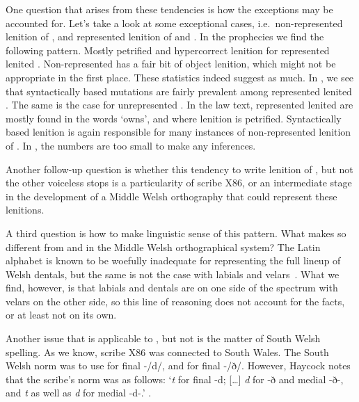 One question that arises from these tendencies is how the exceptions may be accounted for. Let's take a look at some exceptional cases, i.e.\ non-represented lenition of , and represented lenition of  and . In the prophecies we find the following pattern. Mostly petrified and hypercorrect lenition for represented lenited . Non-represented  has a fair bit of object lenition, which might not be appropriate in the first place. These statistics indeed suggest as much. In , we see that syntactically based mutations are fairly prevalent among represented lenited .  The same is the case for unrepresented . In the law text, represented lenited  are mostly found in the words  `owns', and where lenition is petrified. Syntactically based lenition is again responsible for many instances of non-represented lenition of . In , the numbers are too small to make any inferences.

Another follow-up question is whether this tendency to write lenition of , but not the other voiceless stops is a particularity of scribe X86, or an intermediate stage in the development of a Middle Welsh orthography that could represent these lenitions. 

A third question is how to make linguistic sense of this pattern. What makes  so different from  and  in the Middle Welsh orthographical system? The Latin alphabet is known to be woefully inadequate for representing the full lineup of Welsh dentals, but the same is not the case with labials and velars~\autocite{russell_rowynniauc_2003}. What we find, however, is that labials and dentals are on one side of the spectrum with velars on the other side, so this line of reasoning does not account for the facts, or at least not on its own.  

Another issue that is applicable to , but not  is the matter of South Welsh spelling. As we know, scribe X86 was connected to South Wales. The South Welsh norm was to use  for final -/d/, and  for final -/ð/. However, Haycock notes that the scribe's norm was as follows: `\textit{t} for final -d; [\dots] \textit{d} for -ð and medial -ð-, and \textit{t} as well as \textit{d} for medial -d-.' \autocite[p.~7, n.~18]{haycock_legendary_2015}. 




